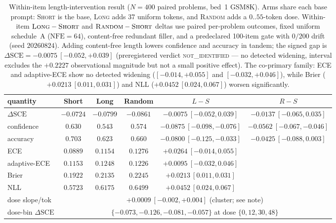 \documentclass{article}
\begin{document}
\begin{table}[t]
\centering
\caption{Within-item length-intervention result ($N{=}400$ paired problems, bed~1
GSM8K).  Arms share each base prompt: \textsc{Short} is the base,
\textsc{Long} adds 37 uniform tokens, and \textsc{Random} adds a $0..55$-token dose.
Within-item $\textsc{Long}-\textsc{Short}$ and $\textsc{Random}-\textsc{Short}$
deltas use paired per-problem outcomes, fixed uniform schedule~A
($\mathrm{NFE}{=}64$), content-free redundant filler, and a predeclared 100-item
gate with $0/200$ drift (seed $20260824$).  Adding content-free length lowers confidence
and accuracy in tandem; the signed gap is $\Delta\mathrm{SCE}=-0.0075\ [-0.052,+0.039]$
(preregistered verdict \textsc{not\_identified} --- no detected widening, interval
excludes the $+0.2227$ observational magnitude but not a small positive effect).
The co-primary family: ECE and adaptive-ECE show no detected widening
($[-0.014,+0.055]$ and $[-0.032,+0.046]$), while Brier
($+0.0213\ [0.011,0.031]$) and NLL ($+0.0452\ [0.024,0.067]$) worsen significantly.}
\label{tab:length-intervention}
\footnotesize
\setlength{\tabcolsep}{3pt}
\begin{tabular}{lccccc}
\toprule
quantity & Short & Long & Random & $L{-}S$ & $R{-}S$\\
\midrule
$\Delta\mathrm{SCE}$ & $-0.0724$ & $-0.0799$ & $-0.0861$ & $-0.0075\ [-0.052,0.039]$ & $-0.0137\ [-0.065,0.035]$\\
confidence & $0.630$ & $0.543$ & $0.574$ & $-0.0875\ [-0.098,-0.076]$ & $-0.0562\ [-0.067,-0.046]$\\
accuracy & $0.703$ & $0.623$ & $0.660$ & $-0.0800\ [-0.125,-0.033]$ & $-0.0425\ [-0.088,0.003]$\\
ECE & $0.0889$ & $0.1154$ & $0.1276$ & $+0.0264\ [-0.014,0.055]$ & \\
adaptive-ECE & $0.1153$ & $0.1248$ & $0.1226$ & $+0.0095\ [-0.032,0.046]$ & \\
Brier & $0.1922$ & $0.2135$ & $0.2245$ & $+0.0213\ [0.011,0.031]$ & \\
NLL & $0.5723$ & $0.6175$ & $0.6499$ & $+0.0452\ [0.024,0.067]$ & \\
\midrule
dose slope/tok & \multicolumn{5}{c}{$+0.0009\ [-0.002,+0.004]$ (cluster; see note)}\\
dose-bin $\Delta\mathrm{SCE}$ & \multicolumn{5}{c}{$\{-0.073,-0.126,-0.081,-0.057\}$ at dose $\{0,12,30,48\}$}\\
\bottomrule
\end{tabular}
\normalsize%
\setlength{\tabcolsep}{6pt}

\end{table}
\end{document}
